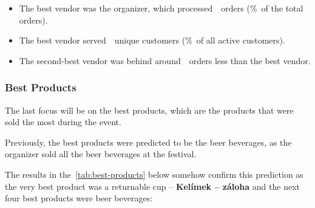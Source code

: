 \begin{keytakeaways}
	\begin{itemize}
		\item The best vendor was the organizer, which processed~~orders (\%~of the total orders).
		\item The best vendor served~~unique customers (\%~of all active customers).
		\item The second-best vendor was behind around~~orders less than the best vendor.
	\end{itemize}
\end{keytakeaways}


\subsubsection{Best Products}
\label{subsubsec:analysis-best-products}

The last focus will be on the best products, which are the products that were sold the most during the event.


Previously, the best products were predicted to be the beer beverages, as the organizer sold all the beer beverages at the festival.

The results in the~\autoref{tab:best-products} below somehow confirm this prediction as the very best product was a returnable cup – \textbf{Kelímek – záloha} and the next four best products were beer beverages:

